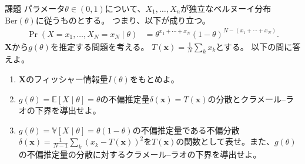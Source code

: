 \documentclass[lualatex,handout]{beamer}
\newcommand{\expt}[1]{\mathbb{E}\left[#1\right]}
\newcommand{\var}[1]{\mathbb{V}\left[#1\right]}
\theoremstyle{definition}
\begin{document}
\begin{frame}{課題}
\small
パラメータ$\theta\in(0,1)$について、$X_1,\dotsc,X_n$が独立なベルヌーイ分布$\mathrm{Ber}(\theta)$に従うものとする。
つまり、以下が成り立つ。
\begin{align*}
\Pr(X=x_1,\dotsc,X_N=x_N\mid\theta)&=\theta^{x_1+\dotsb+x_N}(1-\theta)^{N-(x_1+\dotsb+x_N)}.
\end{align*}
$\symbf{X}$から$g(\theta)$を推定する問題を考える。
$T(\symbf{x})=\frac1N\sum_kx_k$とする。
以下の問に答えよ。

\vspace{1em}
\begin{enumerate}
\setlength{\itemsep}{2em}
\item $\symbf{X}$のフィッシャー情報量$I(\theta)$をもとめよ。
\item $g(\theta)=\expt{X\mid\theta}=\theta$の不偏推定量$\delta(\symbf{x})=T(\symbf{x})$の分散とクラメール--ラオの下界を導出せよ。
\item $g(\theta)=\var{X\mid\theta}=\theta(1-\theta)$の不偏推定量である不偏分散$\delta(\symbf{x})=\frac1{N-1}\sum_k(x_k-T(\symbf{x}))^2$を$T(\symbf{x})$の関数として表せ。また、$g(\theta)$の不偏推定量の分散に対するクラメール--ラオの下界を導出せよ。
\end{enumerate}
\end{frame}
\end{document}
